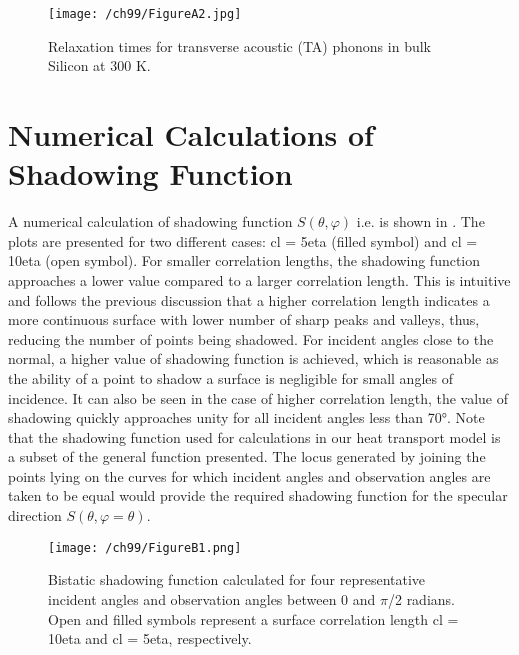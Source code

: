 \begin{appendices}
\begin{figure}[hbt]
	\centering \texttt{[image: /ch99/FigureA2.jpg]}
	\caption{Relaxation times for transverse acoustic (TA) phonons in bulk Silicon at 300 K.}
	\label{fig:appendix-TA}
\end{figure}

\chapter{Numerical Calculations of Shadowing Function}
\label{app:shadowing}
A numerical calculation of shadowing function $S(\theta,\varphi)$ i.e.  is shown in . The plots are presented for two different cases: \gls{cl} = 5\gls{eta} (filled symbol) and \gls{cl} = 10\gls{eta} (open symbol). For smaller correlation lengths, the shadowing function approaches a lower value compared to a larger correlation length. This is intuitive and follows the previous discussion that a higher correlation length indicates a more continuous surface with lower number of sharp peaks and valleys, thus, reducing the number of points being shadowed. For incident angles close to the normal, a higher value of shadowing function is achieved, which is reasonable as the ability of a point to shadow a surface is negligible for small angles of incidence. It can also be seen in the case of higher correlation length, the value of shadowing quickly approaches unity for all incident angles less than \ang{70}. Note that the shadowing function used for calculations in our heat transport model is a subset of the general function presented. The locus generated by joining the points lying on the curves for which incident angles and observation angles are taken to be equal would provide the required shadowing function for the specular direction $S(\theta,\varphi=\theta)$.
\begin{figure}[hbt]
	\centering \texttt{[image: /ch99/FigureB1.png]}
	\caption{Bistatic shadowing function calculated for four representative incident angles and observation angles between 0 and $\pi$/2 radians. Open and filled symbols represent a surface correlation length \gls{cl} = 10\gls{eta} and \gls{cl} = 5\gls{eta}, respectively.}
	\label{fig:appendix-Shadowing}
\end{figure}
\end{appendices}